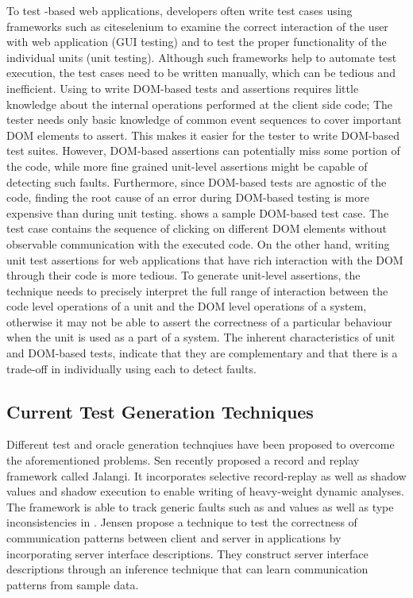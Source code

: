 To test \javascript-based web applications, developers
often write test cases using frameworks such as \selenium cite{selenium} to examine the correct interaction of the user with web application (GUI testing) and \qunit \cite{quint} to test the proper functionality of the individual units (unit testing).
Although such frameworks help to automate test execution, the
test cases need to be written manually, which can be tedious
and inefficient. 
Using \selenium to write DOM-based tests and assertions
requires little knowledge about the internal operations performed at the client side code; The tester needs only basic knowledge of common event sequences to cover important DOM elements to assert. 
This makes it easier for the tester to write DOM-based test suites. However, DOM-based assertions can potentially miss some portion of the
code, while more fine grained unit-level assertions might be capable of detecting such faults. Furthermore, since DOM-based tests are agnostic of the \javascript code, finding the root cause of an error during DOM-based testing is more expensive than during unit testing. 
 shows a sample DOM-based test case. The test case contains the sequence of clicking on different DOM elements without observable communication with the executed \javascript code.  
On the other hand,
writing unit test assertions for web applications that have rich interaction with the DOM through their \javascript code is more tedious. 
To generate unit-level assertions, the technique needs to precisely interpret the full range of interaction between the code level operations of a unit and the DOM level operations of a system, otherwise it may not be able to assert the correctness of a particular behaviour when the unit is used as a part of a system. The inherent characteristics of unit and DOM-based tests, indicate that they are complementary and that there is a trade-off in individually using each to detect faults. 

\subsection{Current Test Generation Techniques} 
Different test and oracle generation technqiues have been proposed to overcome the aforementioned problems.
Sen \etal \cite{sen:fse13} recently proposed a record and replay framework called Jalangi. It incorporates selective record-replay as well as shadow values and shadow execution to enable writing of heavy-weight dynamic analyses.
The framework is able to track generic faults such as  and  values as well as type inconsistencies in \javascript. 
Jensen \etal \cite{jensen:fse13} propose a technique to test the correctness of communication patterns between client and server in \ajax applications by incorporating server interface descriptions.
They construct server interface descriptions through an inference technique that can learn communication patterns from sample data.

